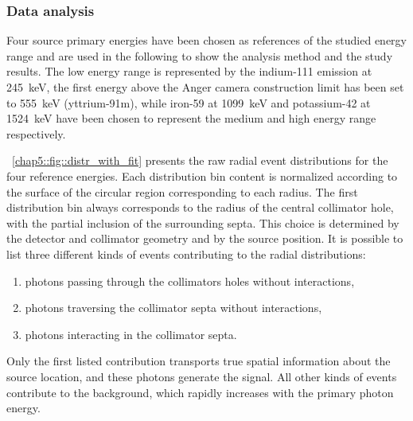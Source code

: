 \subsubsection{Data analysis}\label{chap5::subsubsec::AC_dataTreat}
Four source primary energies have been chosen as references of the studied energy range and are used in the following to show the analysis method and the study results. The low energy range is represented by the indium-111 emission at 245~keV, the first energy above the Anger camera construction limit has been set to 555~keV (yttrium-91m), while iron-59 at 1099~keV and potassium-42 at 1524~keV have been chosen to represent the medium and high energy range respectively. 

\figurename~\ref{chap5::fig::distr_with_fit} presents the raw radial event distributions for the four reference energies. Each distribution bin content is normalized according to the surface of the circular region corresponding to each radius. The first distribution bin always corresponds to the radius of the central collimator hole, with the partial inclusion of the surrounding septa. This choice is determined by the detector and collimator geometry and by the source position. It is possible to list three different kinds of events contributing to the radial distributions:
\begin{enumerate}
\item photons passing through the collimators holes without interactions,
\item photons traversing the collimator septa without interactions,
\item photons interacting in the collimator septa.
\end{enumerate} 
Only the first listed contribution transports true spatial information about the source location, and these photons generate the signal. All other kinds of events contribute to the background, which rapidly increases with the primary photon energy.

